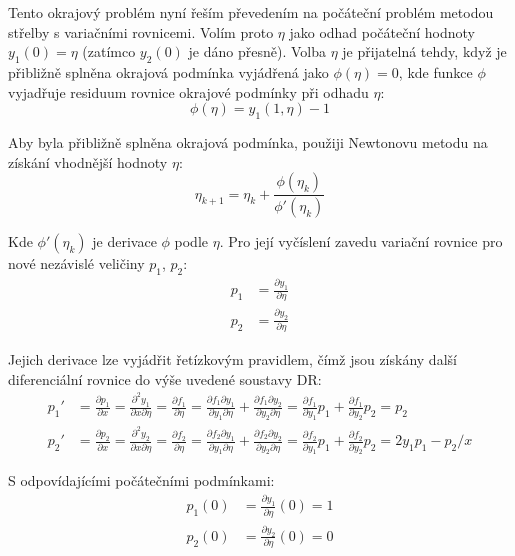 \documentclass[a4paper,12pt]{article}
\begin{document}
Tento okrajový problém nyní řeším převedením na počáteční problém metodou střelby s variačními rovnicemi.
Volím proto $\eta$ jako odhad počáteční hodnoty $y_1(0) = \eta$ (zatímco $y_2(0)$ je dáno přesně).
Volba $\eta$ je přijatelná tehdy, když je přibližně splněna okrajová podmínka vyjádřená jako $\phi(\eta) = 0$, kde funkce $\phi$ vyjadřuje residuum rovnice okrajové podmínky při odhadu $\eta$:
\begin{equation}
	\phi(\eta) = y_1(1, \eta) - 1
\end{equation}

Aby byla přibližně splněna okrajová podmínka, použiji Newtonovu metodu na získání vhodnější hodnoty $\eta$:
\begin{equation}
	\eta_{k+1} = \eta_{k} + \frac{\phi(\eta_k)}{\phi'(\eta_k)}
\end{equation}

Kde $\phi'(\eta_k)$ je derivace $\phi$ podle $\eta$. Pro její vyčíslení zavedu variační rovnice pro nové nezávislé veličiny $p_1$, $p_2$:
\begin{align}
	p_1 &= \frac{\partial y_1}{\partial \eta}
	\\
	p_2 &= \frac{\partial y_2}{\partial \eta}
\end{align}

Jejich derivace lze vyjádřit řetízkovým pravidlem, čímž jsou získány další diferenciální rovnice do výše uvedené soustavy DR:
\begin{align}
	p_1' &=
	\frac{\partial p_1}{\partial x} =
	\frac{\partial^2 y_1}{\partial x \partial \eta} =
	\frac{\partial f_1}{\partial \eta} =
	\frac{\partial f_1 \partial y_1}{\partial y_1 \partial \eta} + \frac{\partial f_1 \partial y_2}{\partial y_2 \partial \eta} =
	\frac{\partial f_1}{\partial y_1} p_1 + \frac{\partial f_1}{\partial y_2} p_2 =
	p_2
	\\
	p_2' &=
	\frac{\partial p_2}{\partial x} =
	\frac{\partial^2 y_2}{\partial x \partial \eta} =
	\frac{\partial f_2}{\partial \eta} =
	\frac{\partial f_2 \partial y_1}{\partial y_1 \partial \eta} + \frac{\partial f_2 \partial y_2}{\partial y_2 \partial \eta} =
	\frac{\partial f_2}{\partial y_1} p_1 + \frac{\partial f_2}{\partial y_2} p_2 =
	2 y_1 p_1 - p_2 / x
\end{align}

S odpovídajícími počátečními podmínkami:
\begin{align}
	p_1(0) &= \frac{\partial y_1}{\partial \eta}(0) = 1
	\\
	p_2(0) &= \frac{\partial y_2}{\partial \eta}(0) = 0
\end{align}
\end{document}

